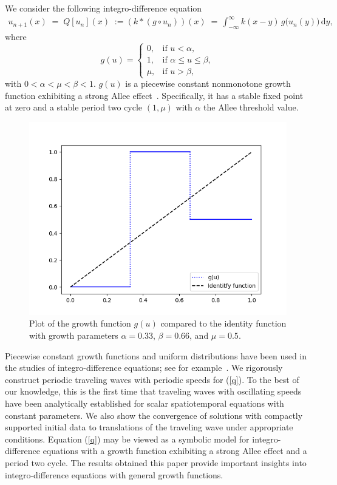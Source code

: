 \documentclass[11pt]{article}
\theoremstyle{definition}
\numberwithin{equation}{section}
\numberwithin{thm}{section}
\renewcommand{\a}{\alpha}
\renewcommand{\b}{\beta}
\newcommand{\m}{\mu}
\begin{document}
We consider the following integro-difference equation
\begin{align}\label{q}
u_{n+1}(x)\;=\;Q[u_n](x)\;:=(k*(g\circ u_n))(x)\;=\,\int^{\infty}_{-\infty}k(x-y)\,g\big(u_n(y)\big)\,\mathrm{d}y,
\end{align}
where 
\begin{equation} \label{g}
g(u) = \begin{cases}
0, & \text{if } u < \a, \\
1, & \text{if } \a \leq u \leq \b, \\
\m, & \text{if } u > \b,
\end{cases}
\end{equation}
with $0<\a<\m<\b<1$. $g(u)$ is a piecewise constant nonmonotone growth function exhibiting a strong Allee effect~\cite{all}. Specifically, it has a stable fixed point at zero and a stable period two cycle $(1,\m)$ with $\a$ the Allee threshold value.

\begin{figure}[h!]
\centering
  \caption{Plot of the growth function $g(u)$ compared to the identity function with growth parameters $\alpha=0.33$, $\beta=0.66$, and $\mu=0.5$.}
  \includegraphics[width=.8\linewidth]{figures/fig1.png}
\end{figure}

Piecewise constant growth functions and uniform distributions have been used in the studies of integro-difference equations; see for example~\cite{kot1, lut,otto,  pnas}. We rigorously construct periodic traveling waves with periodic speeds for (\ref{q}). To the best of our knowledge, this is the first time that traveling waves with oscillating speeds have been analytically established  for scalar spatiotemporal equations with constant parameters. We also show the convergence of solutions with compactly supported initial data to translations of the traveling wave under appropriate conditions. Equation (\ref{q}) may be viewed as a symbolic model for integro-difference equations with a growth function exhibiting a strong Allee effect and a period two cycle. The results obtained this paper provide important insights into integro-difference equations with general growth functions. 
\end{document}

